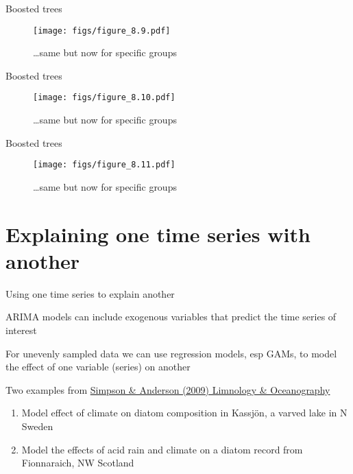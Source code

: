 \documentclass[11pt,ignorenonframetext,compress, aspectratio=169]{beamer}
\providecommand{\tightlist}{%
  \setlength{\itemsep}{0pt}\setlength{\parskip}{0pt}}
\begin{document}
\begin{frame}{Boosted trees}

\begin{figure}[htbp]
\centering
\texttt{[image: figs/figure\_8.9.pdf]}
\caption{\ldots{}same but now for specific groups}
\end{figure}

\end{frame}

\begin{frame}{Boosted trees}

\begin{figure}[htbp]
\centering
\texttt{[image: figs/figure\_8.10.pdf]}
\caption{\ldots{}same but now for specific groups}
\end{figure}

\end{frame}

\begin{frame}{Boosted trees}

\begin{figure}[htbp]
\centering
\texttt{[image: figs/figure\_8.11.pdf]}
\caption{\ldots{}same but now for specific groups}
\end{figure}

\end{frame}

\section{Explaining one time series with
another}\label{explaining-one-time-series-with-another}

\begin{frame}{Using one time series to explain another}

ARIMA models can include exogenous variables that predict the time
series of interest

For unevenly sampled data we can use regression models, esp GAMs, to
model the effect of one variable (series) on another

Two examples from
\href{http://www.aslo.org/lo/toc/vol_54/issue_6_part_2/2529.pdf}{Simpson
\& Anderson (2009) Limnology \& Oceanography}

\begin{enumerate}
\def\labelenumi{\arabic{enumi}.}
\tightlist
\item
  Model effect of climate on diatom composition in Kassjön, a varved
  lake in N Sweden
\item
  Model the effects of acid rain and climate on a diatom record from
  Fionnaraich, NW Scotland
\end{enumerate}

\end{frame}
\end{document}
